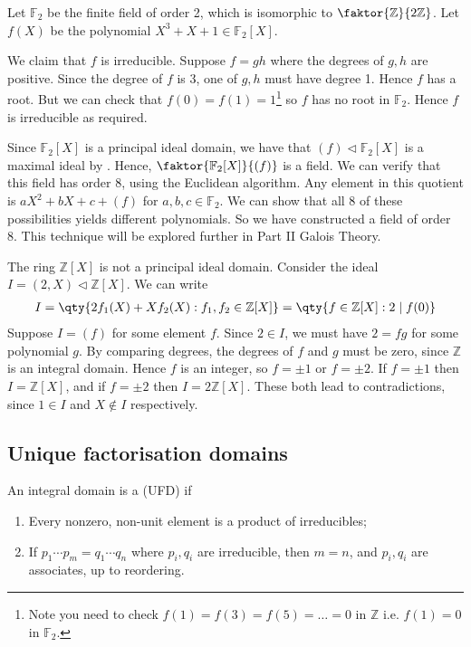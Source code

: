 \begin{example}
	Let $\mathbb F_2$ be the finite field of order 2, which is isomorphic to $\faktor{\mathbb Z}{2 \mathbb Z}$.
	Let $f(X)$ be the polynomial $X^3 + X + 1 \in \mathbb F_2[X]$.

	We claim that $f$ is irreducible.
	Suppose $f = gh$ where the degrees of $g, h$ are positive.
	Since the degree of $f$ is 3, one of $g, h$ must have degree 1.
	Hence $f$ has a root.
	But we can check that $f(0) = f(1) = 1$\footnote{Note you need to check $f(1) = f(3) = f(5) = \dots = 0$ in $\mathbb{Z}$ i.e. $f(1) = 0$ in $\mathbb{F}_2$.} so $f$ has no root in $\mathbb F_2$.
	Hence $f$ is irreducible as required.

	Since $\mathbb F_2[X]$ is a principal ideal domain, we have that $(f) \triangleleft \mathbb F_2[X]$ is a maximal ideal by .
	Hence, $\faktor{\mathbb F_2[X]}{(f)}$ is a field.
	We can verify that this field has order 8, using the Euclidean algorithm.
	Any element in this quotient is $aX^2 + bX + c + (f)$ for $a,b,c \in \mathbb F_2$.
	We can show that all 8 of these possibilities yields different polynomials.
	So we have constructed a field of order 8.
	This technique will be explored further in Part II Galois Theory.
\end{example}

\begin{example}
	The ring $\mathbb Z[X]$ is not a principal ideal domain.
	Consider the ideal $I = (2, X) \triangleleft \mathbb Z[X]$.
	We can write
	\begin{align*}
		I = \qty{2f_1(X) + Xf_2(X) : f_1, f_2 \in \mathbb Z[X]} = \qty{f \in \mathbb Z[X] : 2\mid f(0)}
	\end{align*}
	Suppose $I = (f)$ for some element $f$.
	Since $2 \in I$, we must have $2 = fg$ for some polynomial $g$.
	By comparing degrees, the degrees of $f$ and $g$ must be zero, since $\mathbb Z$ is an integral domain.
	Hence $f$ is an integer, so $f = \pm 1$ or $f = \pm 2$.
	If $f = \pm 1$ then $I = \mathbb Z[X]$, and if $f = \pm 2$ then $I = 2\mathbb Z[X]$.
	These both lead to contradictions, since $1 \in I$ and $X \not\in I$ respectively.
\end{example}

\subsection{Unique factorisation domains}

\begin{definition}
	An integral domain is a  (UFD) if
	\begin{enumerate}
		\item Every nonzero, non-unit element is a product of irreducibles;
		\item If $p_1 \cdots p_m = q_1 \cdots q_n$ where $p_i, q_i$ are irreducible, then $m = n$, and $p_i, q_i$ are associates, up to reordering.
	\end{enumerate}
\end{definition}

